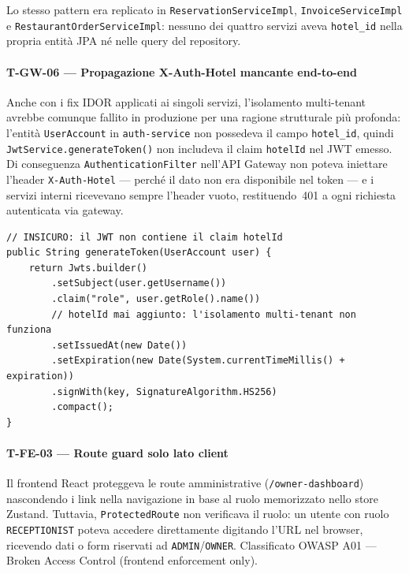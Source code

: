﻿\documentclass[a4paper,12pt]{report}
\begin{document}
Lo stesso pattern era replicato in \texttt{ReservationServiceImpl},
\texttt{InvoiceServiceImpl} e \texttt{RestaurantOrderServiceImpl}: nessuno dei quattro
servizi aveva \texttt{hotel\_id} nella propria entità JPA né nelle query del repository.

\paragraph{T-GW-06 — Propagazione X-Auth-Hotel mancante end-to-end}
Anche con i fix IDOR applicati ai singoli servizi, l'isolamento multi-tenant avrebbe
comunque fallito in produzione per una ragione strutturale più profonda: l'entità
\texttt{UserAccount} in \texttt{auth-service} non possedeva il campo \texttt{hotel\_id},
quindi \texttt{JwtService.generateToken()} non includeva il claim \texttt{hotelId}
nel JWT emesso. Di conseguenza \texttt{AuthenticationFilter} nell'API Gateway non
poteva iniettare l'header \texttt{X-Auth-Hotel} --- perché il dato non era disponibile
nel token --- e i servizi interni ricevevano sempre l'header vuoto, restituendo~401
a ogni richiesta autenticata via gateway.

\begin{insecurebox}[title={JwtService.java (auth-service) --- claim hotelId assente (baseline)}]
\begin{lstlisting}[style=java]
// INSICURO: il JWT non contiene il claim hotelId
public String generateToken(UserAccount user) {
    return Jwts.builder()
        .setSubject(user.getUsername())
        .claim("role", user.getRole().name())
        // hotelId mai aggiunto: l'isolamento multi-tenant non funziona
        .setIssuedAt(new Date())
        .setExpiration(new Date(System.currentTimeMillis() + expiration))
        .signWith(key, SignatureAlgorithm.HS256)
        .compact();
}
\end{lstlisting}
\end{insecurebox}

\paragraph{T-FE-03 — Route guard solo lato client}
Il frontend React proteggeva le route amministrative (\texttt{/owner-dashboard})
nascondendo i link nella navigazione in base al ruolo memorizzato nello store Zustand.
Tuttavia, \texttt{ProtectedRoute} non verificava il ruolo: un utente con ruolo
\texttt{RECEPTIONIST} poteva accedere direttamente digitando l'URL nel browser,
ricevendo dati o form riservati ad \texttt{ADMIN}/\texttt{OWNER}.
Classificato OWASP A01 --- Broken Access Control (frontend enforcement only).
\end{document}
